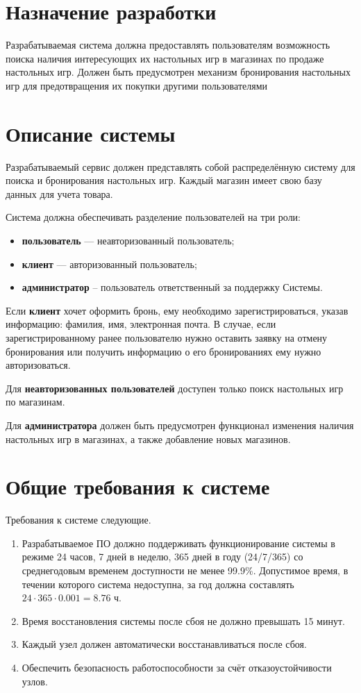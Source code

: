 \section*{Назначение разработки}
Разрабатываемая система должна предоставлять пользователям возможность поиска наличия интересующих их настольных игр в магазинах по продаже настольных игр. Должен быть предусмотрен механизм бронирования настольных игр для предотвращения их покупки другими пользователями

\section*{Описание системы}
Разрабатываемый сервис должен представлять собой распределённую систему для поиска и бронирования настольных игр. Каждый магазин имеет свою базу данных для учета товара.

Система должна обеспечивать разделение пользователей на три роли:
\begin{itemize}
	\item \textbf{пользователь} — неавторизованный пользователь;
	\item \textbf{клиент} — авторизованный пользователь;
	\item \textbf{администратор} -- пользователь ответственный за поддержку Системы.
\end{itemize}

Если \textbf{клиент} хочет оформить бронь, ему необходимо зарегистрироваться, указав информацию: фамилия, имя, электронная почта. В случае, если зарегистрированному ранее пользователю нужно оставить заявку на отмену бронирования или получить информацию о его бронированиях ему нужно авторизоваться.

Для \textbf{неавторизованных пользователей} доступен только поиск настольных игр по магазинам.

Для \textbf{администратора} должен быть предусмотрен функционал изменения наличия настольных игр в магазинах, а также добавление новых магазинов.

\section*{Общие требования к системе}
Требования к системе следующие.
\begin{enumerate}
	\item Разрабатываемое ПО должно поддерживать функционирование системы в режиме 24 часов, 7 дней в неделю, 365 дней в году (24/7/365) со среднегодовым временем доступности не менее 99.9\%. Допустимое время, в течении которого система недоступна, за год должна составлять $24\cdot365\cdot0.001=8.76$ ч.
	
	\item Время восстановления системы после сбоя не должно превышать 15 минут.
	
	\item Каждый узел должен автоматически восстанавливаться после сбоя.
	
	\item Обеспечить безопасность работоспособности за счёт отказоустойчивости узлов.
\end{enumerate}

